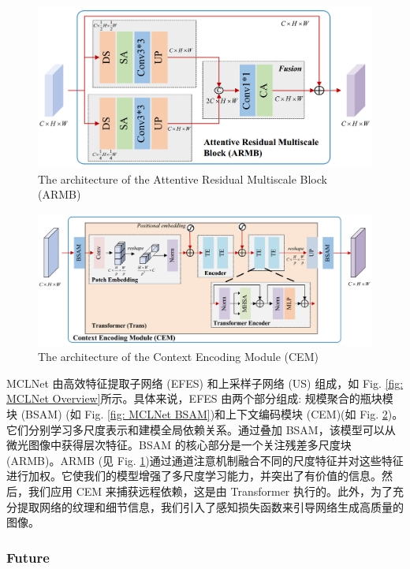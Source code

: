 \documentclass[a4paper, 10pt]{article}
\begin{document}
			\begin{figure}[htbp]
				\centering 
				\includegraphics[width=0.7\columnwidth]{picture/LLIE/MCLNet/ARMB}
				\caption{
					\label{fig: MCLNet ARMB} 
					The architecture of the Attentive Residual Multiscale Block (ARMB)
				}
			\end{figure}
			
			\begin{figure}[htbp]
				\centering 
				\includegraphics[width=0.7\columnwidth]{picture/LLIE/MCLNet/CEM}
				\caption{
					\label{fig: MCLNet CEM} 
					The architecture of the Context Encoding Module (CEM)
				}
			\end{figure}
			
			MCLNet 由高效特征提取子网络 (EFES) 和上采样子网络 (US) 组成，如 Fig. \ref{fig: MCLNet Overview}所示。具体来说，EFES 由两个部分组成: 规模聚合的瓶块模块 (BSAM) (如 Fig. \ref{fig: MCLNet BSAM})和上下文编码模块 (CEM)(如 Fig. \ref{fig: MCLNet CEM})。它们分别学习多尺度表示和建模全局依赖关系。通过叠加 BSAM，该模型可以从微光图像中获得层次特征。BSAM 的核心部分是一个关注残差多尺度块 (ARMB)。ARMB (见 Fig. \ref{fig: MCLNet ARMB})通过通道注意机制融合不同的尺度特征并对这些特征进行加权。它使我们的模型增强了多尺度学习能力，并突出了有价值的信息。然后，我们应用 CEM 来捕获远程依赖，这是由 Transformer 执行的。此外，为了充分提取网络的纹理和细节信息，我们引入了感知损失函数来引导网络生成高质量的图像。
			
			\subsubsection{Future}
			
\end{document}
